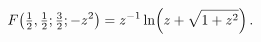 \[\mathop{F\/}\nolimits\!\left(\tfrac{1}{2},\tfrac{1}{2};\tfrac{3}{2};-z^{2}%
\right)=z^{-1}\mathop{\ln\/}\nolimits\!\left(z+\sqrt{1+z^{2}}\right).\]